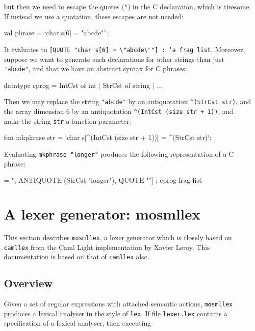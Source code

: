 \documentclass[fleqn]{article}
\begin{document}
\noindent but then we need to escape the quotes ({\tt "}) in the C
declaration, which is tiresome.  If instead we use a quotation, these
escapes are not needed:

\begin{program}
val phrase = `char s[6] = "abcde"`;
\end{program}

\noindent It evaluates to {\tt [QUOTE "char s[6] =
  \verb#\"#abcde\verb#\#""] :\ 'a frag list}.  Moreover, suppose we
want to generate such declarations for other strings than just {\tt
  "abcde"}, and that we have an abstract syntax for C phrases:

\begin{program}
datatype cprog =
    IntCst of int
  | StrCst of string
  | ...  
\end{program}

\noindent Then we may replace the string {\tt "abcde"} by an
antiquotation {\tt \verb#^#(StrCst str)}, and the array dimension 6 by
an antiquotation {\tt \verb#^#(IntCst (size str + 1))}, and make the
string {\tt str} a function parameter:

\begin{program}
fun mkphrase str = `char s[^(IntCst (size str + 1))] = ^(StrCst str)`;
\end{program}

\noindent Evaluating {\tt mkphrase "longer"} produces the following
representation of a C phrase:

\begin{program}
[QUOTE "char s[", ANTIQUOTE (IntCst 7), QUOTE "] = ", 
 ANTIQUOTE (StrCst "longer"), QUOTE ""] : cprog frag list
\end{program}


\newpage

\section{A lexer generator: mosmllex}
\label{sec-mosmllex}

This section describes {\tt mosmllex}, a lexer generator which is
closely based on {\tt camllex} from the Caml Light implementation by
Xavier Leroy.  This documentation is based on that of {\tt camllex}
also.  


\subsection{Overview}

Given a set of regular expressions with attached semantic actions,
{\tt mosmllex} produces a lexical analyser in the style of {\tt lex}.
If file {\tt lexer.lex} contains a specification of a lexical
analyser, then executing
\end{document}
